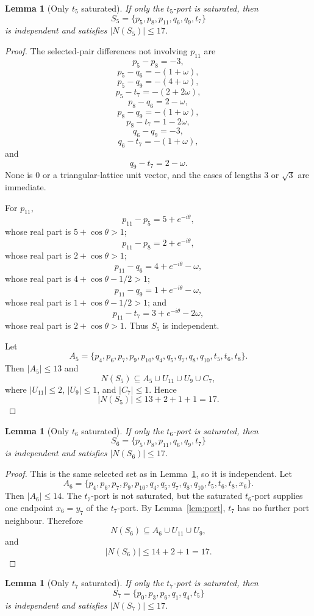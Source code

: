 \documentclass[11pt]{article}
\newtheorem{lemma}[theorem]{Lemma}
\begin{document}
\begin{lemma}[Only $t_5$ saturated]\label{lem:row5}
If only the $t_5$-port is saturated, then
\[
 S_5=\{p_5,p_8,p_{11},q_6,q_9,t_7\}
\]
is independent and satisfies $|N(S_5)|\le17$.
\end{lemma}

\begin{proof}
The selected-pair differences not involving $p_{11}$ are
\[
 p_5-p_8=-3,
\]
\[
 p_5-q_6=-(1+\omega),
\]
\[
 p_5-q_9=-(4+\omega),
\]
\[
 p_5-t_7=-(2+2\omega),
\]
\[
 p_8-q_6=2-\omega,
\]
\[
 p_8-q_9=-(1+\omega),
\]
\[
 p_8-t_7=1-2\omega,
\]
\[
 q_6-q_9=-3,
\]
\[
 q_6-t_7=-(1+\omega),
\]
and
\[
 q_9-t_7=2-\omega.
\]
None is $0$ or a triangular-lattice unit vector, and the cases of lengths $3$ or $\sqrt3$ are immediate.

For $p_{11}$,
\[
 p_{11}-p_5=5+e^{-i\theta},
\]
whose real part is $5+\cos\theta>1$;
\[
 p_{11}-p_8=2+e^{-i\theta},
\]
whose real part is $2+\cos\theta>1$;
\[
 p_{11}-q_6=4+e^{-i\theta}-\omega,
\]
whose real part is $4+\cos\theta-1/2>1$;
\[
 p_{11}-q_9=1+e^{-i\theta}-\omega,
\]
whose real part is $1+\cos\theta-1/2>1$; and
\[
 p_{11}-t_7=3+e^{-i\theta}-2\omega,
\]
whose real part is $2+\cos\theta>1$. Thus $S_5$ is independent.

Let
\[
 A_5=\{p_4,p_6,p_7,p_9,p_{10},q_4,q_5,q_7,q_8,q_{10},t_5,t_6,t_8\}.
\]
Then $|A_5|\le13$ and
\[
 N(S_5)\subseteq A_5\cup U_{11}\cup U_9\cup C_7,
\]
where $|U_{11}|\le2$, $|U_9|\le1$, and $|C_7|\le1$. Hence
\[
 |N(S_5)|\le13+2+1+1=17.
\]
\end{proof}

\begin{lemma}[Only $t_6$ saturated]\label{lem:row6}
If only the $t_6$-port is saturated, then
\[
 S_6=\{p_5,p_8,p_{11},q_6,q_9,t_7\}
\]
is independent and satisfies $|N(S_6)|\le17$.
\end{lemma}

\begin{proof}
This is the same selected set as in Lemma~\ref{lem:row5}, so it is independent. Let
\[
A_6=\{p_4,p_6,p_7,p_9,p_{10},q_4,q_5,q_7,q_8,q_{10},t_5,t_6,t_8,x_6\}.
\]
Then $|A_6|\le14$. The $t_7$-port is not saturated, but the saturated $t_6$-port supplies one endpoint $x_6=y_7$ of the $t_7$-port. By Lemma~\ref{lem:port}, $t_7$ has no further port neighbour. Therefore
\[
 N(S_6)\subseteq A_6\cup U_{11}\cup U_9,
\]
and
\[
 |N(S_6)|\le14+2+1=17.
\]
\end{proof}

\begin{lemma}[Only $t_7$ saturated]\label{lem:row7}
If only the $t_7$-port is saturated, then
\[
 S_7=\{p_0,p_3,p_6,q_1,q_4,t_5\}
\]
is independent and satisfies $|N(S_7)|\le17$.
\end{lemma}
\end{document}
